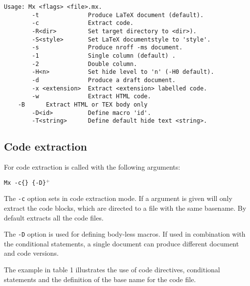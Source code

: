 \begin{verbatim}
Usage: Mx <flags> <file>.mx.
        -t              Produce LaTeX document (default).
        -c              Extract code.
        -R<dir>         Set target directory to <dir>).
        -S<style>       Set LaTeX documentstyle to 'style'.
        -s              Produce nroff -ms document.
        -1              Single column (default) .
        -2              Double column.
        -H<n>           Set hide level to 'n' (-H0 default).
        -d              Produce a draft document.
        -x <extension>  Extract <extension> labelled code.
        -w              Extract HTML code.
	-B		Extract HTML or TEX body only
        -D<id>          Define macro 'id'.
        -T<string>      Define default hide text <string>.
\end{verbatim}

\subsection{Code extraction}

For code extraction \Mx is called with the following arguments:
\noindent
\begin{center}
        {\tt Mx -c\{\file\} \{-D\macro\}$^+$ \mxfile }
\end{center}

The {\tt -c} option sets \Mx in code extraction mode. If a \file
argument is given \Mx will only extract the code blocks, which are
directed to a file with the same basename. 
By default \Mx extracts all the code files. 

The {\tt -D\macro} option is used for defining body-less macros. If used in
combination with the conditional statements, a single \Mx document can
produce different document and code versions.

The example in table 1 illustrates the use of code directives,
conditional statements and the definition of the base name for the
code file.



